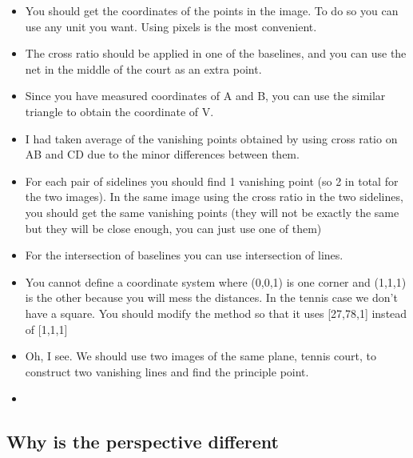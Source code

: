 \documentclass[12pt, oneside]{article}
\begin{document}
\begin{itemize}
    \item You should get the coordinates of the points in the image. To do so you can use 
        any unit you want. Using pixels is the most convenient. 
    \item The cross ratio should  be applied in one of the baselines, and you can use 
        the net in the middle of the court as an extra point.
    \item Since you have measured coordinates of A and B, you can use the similar triangle 
        to obtain the coordinate of V.
    \item I had taken average of the vanishing points obtained by using cross ratio on AB 
        and CD due to the minor differences between them.
    \item For each pair of sidelines you should find 1 vanishing point (so 2 in total 
        for the two images). In the same image using the cross ratio in the two sidelines, 
        you  should get the same vanishing points (they will not be exactly the same but 
        they will be close enough, you can just use one of them)
    \item For the intersection of baselines you can use intersection of lines.
    \item You cannot define a coordinate system where (0,0,1) is one corner and (1,1,1) 
        is the other because you will mess the distances. In the tennis case we don't 
        have a square. You should modify the method so that it uses [27,78,1] 
        instead of [1,1,1]
    \item  Oh, I see. We should use two images of the same plane, tennis court, to construct 
        two vanishing lines and find the principle point.
    \item 
\end{itemize}


\subsection{Why is the perspective different}
\end{document}
